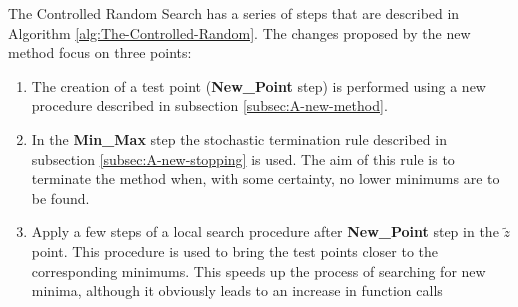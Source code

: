 \documentclass[symmetry,article,submit,moreauthors,pdftex]{mdpi}
\begin{document}
The Controlled Random Search has a series of steps that are described
in Algorithm \ref{alg:The-Controlled-Random}. The changes proposed
by the new method focus on three points:
\begin{enumerate}
\item The creation of a test point (\textbf{New\_Point} step)
is performed using a new procedure  described in subsection \ref{subsec:A-new-method}.
\item In the \textbf{Min\_Max} step the stochastic termination rule described
in subsection \ref{subsec:A-new-stopping} is used. The aim of this
rule is to terminate the method when, with some certainty, no lower
minimums are to be found. 
\item Apply a few steps of a local search procedure after \textbf{New\_Point}
step in the $\tilde{z}$ point. This procedure is used to bring the
test points closer to the corresponding minimums. This speeds up the
process of searching for new minima, although it obviously leads to
an increase in function calls 
\end{enumerate}
\end{document}
